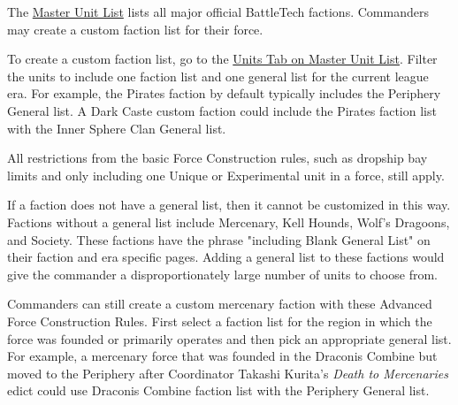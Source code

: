 The \href{http://www.masterunitlist.info/}{Master Unit List} lists all major official BattleTech factions.
Commanders may create a custom faction list for their force.

To create a custom faction list, go to the \href{http://www.masterunitlist.info/Unit/Filter}{Units Tab on Master Unit List}.
Filter the units to include one faction list and one general list for the current league era.
For example, the Pirates faction by default typically includes the Periphery General list.
A Dark Caste custom faction could include the Pirates faction list with the Inner Sphere Clan General list.

All restrictions from the basic Force Construction rules, such as dropship bay limits and only including one Unique or Experimental unit in a force, still apply.

If a faction does not have a general list, then it cannot be customized in this way.
Factions without a general list include Mercenary, Kell Hounds, Wolf's Dragoons, and Society.
These factions have the phrase "including Blank General List" on their faction and era specific pages.
Adding a general list to these factions would give the commander a disproportionately large number of units to choose from.

Commanders can still create a custom mercenary faction with these Advanced Force Construction Rules.
First select a faction list for the region in which the force was founded or primarily operates and then pick an appropriate general list.
For example, a mercenary force that was founded in the Draconis Combine but moved to the Periphery after Coordinator Takashi Kurita's \emph{Death to Mercenaries} edict could use Draconis Combine faction list with the Periphery General list.
